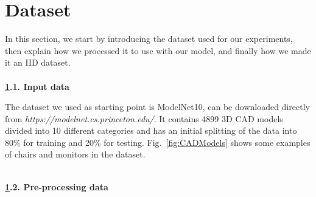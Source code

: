 \section{Dataset}
\label{sec:dataset}

In this section, we start by introducing the dataset used for our experiments, then explain how we processed it to use with our model, and finally how we made it an \ac{IID} dataset.
\ \\\\%
\textbf{\ref{sec:dataset}.1. Input data} 

The dataset we used as starting point is ModelNet10, can be downloaded directly from \textit{https://modelnet.cs.princeton.edu/}. It contains 4899 3D CAD models divided into 10 different categories and has an initial splitting of the data into 80\% for training and 20\% for testing.
Fig.~\ref{fig:CADModels} shows some examples of chairs and monitors in the dataset.

\ \\ %
\textbf{\ref{sec:dataset}.2. Pre-processing data}


